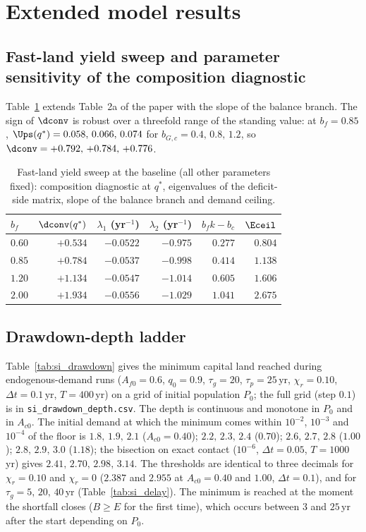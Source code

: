 \section{Extended model results}\label{si:results}

\subsection{Fast-land yield sweep and parameter sensitivity of the composition diagnostic}\label{si:sweep}

Table~\ref{tab:si_sweep} extends Table~2a of the paper with the slope of the balance branch. The sign of $\dconv$ is robust over a threefold range of the standing value: at $b_f=0.85$, $\Ups(q^*)=0.058,\,0.066,\,0.074$ for $b_{G,c}=0.4,\,0.8,\,1.2$, so $\dconv=+0.792,\,+0.784,\,+0.776$.

\begin{table}[htbp]
\centering\small
\caption{Fast-land yield sweep at the baseline (all other parameters fixed): composition diagnostic at $q^*$, eigenvalues of the deficit-side matrix, slope of the balance branch and demand ceiling.}
\label{tab:si_sweep}
\begin{tabular}{l r r r r r}
\toprule
$b_f$ & $\dconv(q^*)$ & $\lambda_1$ (yr$^{-1}$) & $\lambda_2$ (yr$^{-1}$) & $b_fk-b_c$ & $\Eceil$ \\
\midrule
$0.60$ & $+0.534$ & $-0.0522$ & $-0.975$ & $0.277$ & $0.804$ \\
$0.85$ & $+0.784$ & $-0.0537$ & $-0.998$ & $0.414$ & $1.138$ \\
$1.20$ & $+1.134$ & $-0.0547$ & $-1.014$ & $0.605$ & $1.606$ \\
$2.00$ & $+1.934$ & $-0.0556$ & $-1.029$ & $1.041$ & $2.675$ \\
\bottomrule
\end{tabular}
\end{table}

\subsection{Drawdown-depth ladder}\label{si:ladder}

Table~\ref{tab:si_drawdown} gives the minimum capital land reached during endogenous-demand runs ($A_{f0}=0.6$, $q_0=0.9$, $\tau_g=20$, $\tau_p=25$\,yr, $\chi_r=0.10$, $\Delta t=0.1$\,yr, $T=400$\,yr) on a grid of initial population $P_0$; the full grid (step $0.1$) is in \texttt{si\_drawdown\_depth.csv}. The depth is continuous and monotone in $P_0$ and in $A_{c0}$. The initial demand at which the minimum comes within $10^{-2}$, $10^{-3}$ and $10^{-4}$ of the floor is $1.8,\,1.9,\,2.1$ ($A_{c0}=0.40$); $2.2,\,2.3,\,2.4$ ($0.70$); $2.6,\,2.7,\,2.8$ ($1.00$); $2.8,\,2.9,\,3.0$ ($1.18$); the bisection on exact contact ($10^{-6}$, $\Delta t=0.05$, $T=1000$\,yr) gives $2.41,\,2.70,\,2.98,\,3.14$. The thresholds are identical to three decimals for $\chi_r=0.10$ and $\chi_r=0$ ($2.387$ and $2.955$ at $A_{c0}=0.40$ and $1.00$, $\Delta t=0.1$), and for $\tau_g=5,\,20,\,40$\,yr (Table~\ref{tab:si_delay}). The minimum is reached at the moment the shortfall closes ($B\ge E$ for the first time), which occurs between $3$ and $25$\,yr after the start depending on $P_0$.

